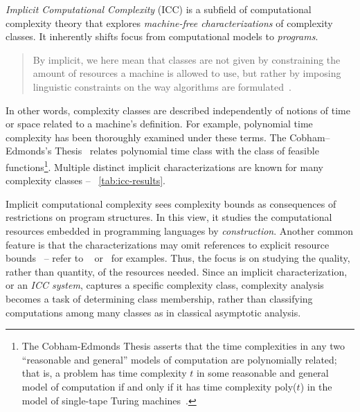 \emph{Implicit Computational Complexity} (ICC) is a subfield of computational complexity theory that explores \emph{machine-free characterizations} of complexity classes.
It inherently shifts focus from computational models to \emph{programs}.
\begin{quotation}
    \noindent By implicit, we here mean that classes are not given by constraining the amount of resources a machine is allowed to use, but rather by imposing linguistic constraints on the way algorithms are formulated~\cite[p. 90]{dallago2011}.
\end{quotation}
In other words, complexity classes are described independently of notions of time or space related to a machine's definition.
For example, polynomial time complexity has been thoroughly examined under these terms.
The Cobham–Edmonds's Thesis~\cite{cobham1965,edmonds1965} relates polynomial time class with the class of feasible functions\index{}\footnote{
    The Cobham-Edmonds Thesis asserts that the time complexities in any two \enquote{reasonable and general} models of computation are polynomially related;
    that is, a problem has time complexity \(t\) in some reasonable and general model of computation
    if and only if it has time complexity poly(\(t\)) in the model of single-tape Turing machines~\cite[p. 33]{goldreich2008}.}.
Multiple distinct implicit characterizations are known for many complexity classes -- \cf~\autoref{tab:icc-results}.

Implicit computational complexity sees complexity bounds as consequences of restrictions on program structures.
In this view, it studies the computational resources embedded in programming languages by \emph{construction}.
Another common feature is that the characterizations may omit references to explicit resource bounds~\cite{moyen2017} -- refer to \eg~%
\textcite{bellantoni1992} or~\textcite{kristiansen2005} for examples.
Thus, the focus is on studying the quality, rather than quantity, of the resources needed.
Since an implicit characterization, or an \emph{ICC system}, captures a specific complexity class, complexity analysis becomes a task of determining class membership, rather than classifying computations among many classes as in classical asymptotic analysis.

